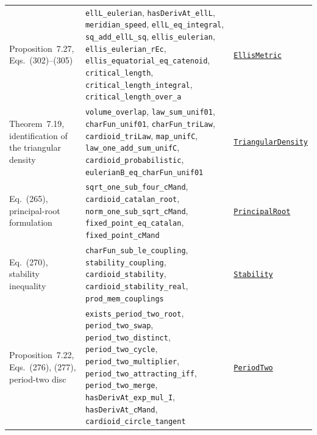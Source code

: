 \documentclass[11pt,a4paper]{article}
\newcommand{\R}{https://github.com/ralfanop/Certifications_Eulerian_polar-curve_computations}
\newcommand{\A}{\R/blob/main/certifications/manuscript15}
\begin{document}
{\begin{longtable}{@{}>{\raggedright\arraybackslash}p{}>{\raggedright\arraybackslash}p{}>{\raggedright\arraybackslash}p{}@{}}
Proposition~7.27, Eqs.~(302)--(305) & \texttt{ellL\_\allowbreak eulerian}, \texttt{hasDerivAt\_\allowbreak ellL}, \texttt{meridian\_\allowbreak speed}, \texttt{ellL\_\allowbreak eq\_\allowbreak integral}, \texttt{sq\_\allowbreak add\_\allowbreak ellL\_\allowbreak sq}, \texttt{ellis\_\allowbreak eulerian}, \texttt{ellis\_\allowbreak eulerian\_\allowbreak rEc}, \texttt{ellis\_\allowbreak equatorial\_\allowbreak eq\_\allowbreak catenoid}, \texttt{critical\_\allowbreak length}, \texttt{critical\_\allowbreak length\_\allowbreak integral}, \texttt{critical\_\allowbreak length\_\allowbreak over\_\allowbreak a} & \href{\A/LEAN/M15Cert/M15Cert/EllisMetric.lean}{\texttt{EllisMetric}}\\
Theorem~7.19, identification of the triangular density & \texttt{volume\_\allowbreak overlap}, \texttt{law\_\allowbreak sum\_\allowbreak unif01}, \texttt{charFun\_\allowbreak unif01}, \texttt{charFun\_\allowbreak triLaw}, \texttt{cardioid\_\allowbreak triLaw}, \texttt{map\_\allowbreak unifC}, \texttt{law\_\allowbreak one\_\allowbreak add\_\allowbreak sum\_\allowbreak unifC}, \texttt{cardioid\_\allowbreak probabilistic}, \texttt{eulerianB\_\allowbreak eq\_\allowbreak charFun\_\allowbreak unif01} & \href{\A/LEAN/M15Cert/M15Cert/TriangularDensity.lean}{\texttt{TriangularDensity}}\\
Eq.~(265), principal-root formulation & \texttt{sqrt\_\allowbreak one\_\allowbreak sub\_\allowbreak four\_\allowbreak cMand}, \texttt{cardioid\_\allowbreak catalan\_\allowbreak root}, \texttt{norm\_\allowbreak one\_\allowbreak sub\_\allowbreak sqrt\_\allowbreak cMand}, \texttt{fixed\_\allowbreak point\_\allowbreak eq\_\allowbreak catalan}, \texttt{fixed\_\allowbreak point\_\allowbreak cMand} & \href{\A/LEAN/M15Cert/M15Cert/PrincipalRoot.lean}{\texttt{PrincipalRoot}}\\
Eq.~(270), stability inequality & \texttt{charFun\_\allowbreak sub\_\allowbreak le\_\allowbreak coupling}, \texttt{stability\_\allowbreak coupling}, \texttt{cardioid\_\allowbreak stability}, \texttt{cardioid\_\allowbreak stability\_\allowbreak real}, \texttt{prod\_\allowbreak mem\_\allowbreak couplings} & \href{\A/LEAN/M15Cert/M15Cert/Stability.lean}{\texttt{Stability}}\\
Proposition~7.22, Eqs.~(276), (277), period-two disc & \texttt{exists\_\allowbreak period\_\allowbreak two\_\allowbreak root}, \texttt{period\_\allowbreak two\_\allowbreak swap}, \texttt{period\_\allowbreak two\_\allowbreak distinct}, \texttt{period\_\allowbreak two\_\allowbreak cycle}, \texttt{period\_\allowbreak two\_\allowbreak multiplier}, \texttt{period\_\allowbreak two\_\allowbreak attracting\_\allowbreak iff}, \texttt{period\_\allowbreak two\_\allowbreak merge}, \texttt{hasDerivAt\_\allowbreak exp\_\allowbreak mul\_\allowbreak I}, \texttt{hasDerivAt\_\allowbreak cMand}, \texttt{cardioid\_\allowbreak circle\_\allowbreak tangent} & \href{\A/LEAN/M15Cert/M15Cert/PeriodTwo.lean}{\texttt{PeriodTwo}}\\
\end{longtable}}
\end{document}

